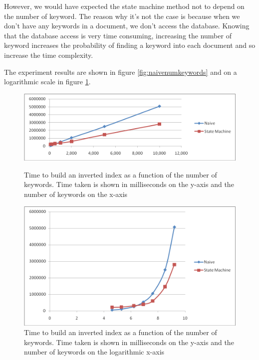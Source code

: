 \documentclass[10pt]{article}
\begin{document}
However, we would have expected the state machine method not to depend
on the number of keyword. The reason why it’s not the case is because
when we don’t have any keywords in a document, we don’t access the
database. Knowing that the database access is very time consuming,
increasing the number of keyword increases the probability of finding a
keyword into each document and so increase the time complexity.  

The experiment results are shown in figure \ref{fig:naivenumkeywords}
and on a logarithmic scale in figure \ref{fig:naivenumkeywordslog}.


\begin{figure}[ht]
  \begin{minipage}[b]{0.5\linewidth}
    \centering
    \includegraphics[width=\textwidth]{naivenumkeywords}
    \caption{Time to build an inverted index as a function of the
      number of keywords. Time taken is shown in milliseconds on the
      y-axis and the number of keywords on the x-axis}
    \label{fig:naivenumkeywords}
  \end{minipage}
  \hspace{0.5cm}
  \begin{minipage}[b]{0.5\linewidth}
    \centering
    \includegraphics[width=\textwidth]{naivenumkeywordslog}
    \caption{Time to build an inverted index as a function of the
      number of keywords. Time taken is shown in milliseconds on the
      y-axis and the number of keywords on the logarithmic x-axis}
    \label{fig:naivenumkeywordslog}
  \end{minipage}
\end{figure}
\end{document}
